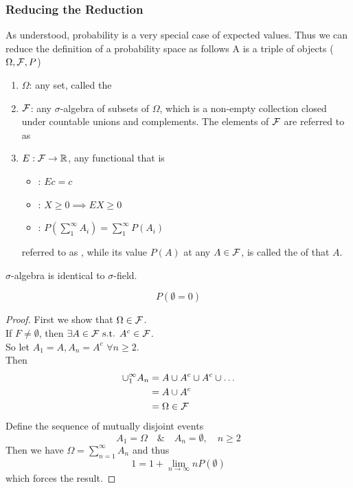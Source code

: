 \documentclass[11pt]{article}
\numberwithin{equation}{section}
\begin{document}
\subsubsection{Reducing the Reduction}
As understood, probability is a very special case of expected values. Thus we can reduce the definition of a probability space as follows
A  is a triple of objects ($\Omega, \mathcal{F}, P$)
\begin{enumerate}
	\item $\Omega$: any set, called the 
	\item $\mathcal{F}$: any $\sigma$-algebra of subsets of $\Omega$, which is a non-empty collection closed under countable unions and complements. The elements of $\mathcal{F}$ are referred to as 
	\item $E: \mathcal{F} \rightarrow \mathbb{R}$, any functional that is 
	\begin{itemize}
		\item {}: $Ec = c$
		\item {}: $X \geq 0 \implies EX \geq 0$
		\item {}: $P(\sum_1^{\infty}A_i) = \sum_1^{\infty}P(A_i)$
	\end{itemize}
	referred to as , while its value $P(A)$ at any $A \in \mathcal{F}$, is called the  of that $A$.
\end{enumerate} 

\remark
$\sigma$-algebra is identical to $\sigma$-field.

\proposition[nullity]
$$P(\emptyset = 0)$$
\begin{proof}
	First we show that $\Omega \in \mathcal{F}$. \\
	If $F \neq \emptyset$, then $\exists A \in \mathcal{F} \text{ s.t. } A^c \in \mathcal{F}$. \\
	So let $A_1 = A, A_n = A^c \,\, \forall n \geq 2$. \\
	Then 
	\begin{align*}
		\cup_1^\infty A_n &= A \cup A^c \cup A^c \cup \hdots \\
		&= A \cup A^c \\
		&= \Omega \in \mathcal{F}
	\end{align*}
	Define the sequence of mutually disjoint events
	$$A_1 = \Omega \quad \& \quad A_n = \emptyset, \quad n \geq 2$$
	Then we have $\Omega = \sum_{n=1}^\infty A_n$ and thus 
	$$ 1 = 1 + \lim_{n\rightarrow\infty} nP(\emptyset)$$
	which forces the result.
\end{proof}
\end{document}
